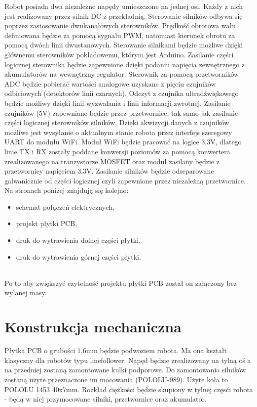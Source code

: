 \documentclass[10pt, a4paper]{article}
\begin{document}
Robot posiada dwa niezależne napędy umieszczone na jednej osi. Każdy z nich jest realizowany przez silnik DC z przekładnią. Sterowanie silników odbywa się poprzez zastosowanie dwukanałowych sterowników. Prędkość obrotowa wału definiowana będzie za pomocą sygnału PWM, natomiast kierunek obrotu za pomocą dwóch linii dwustanowych. Sterowanie silnikami będzie możliwe dzięki głównemu sterowników pokładowemu, którym jest Arduino. Zasilanie części logicznej sterownika będzie zapewnione dzięki podaniu napięcia zewnętrznego z akumulatorów na wewnętrzny regulator. Sterownik za pomocą przetworników ADC będzie pobierać wartości analogowe uzyskane z pięciu czujników odbiciowych (detektorów linii czarnych). Odczyt z czujnika ultradźwiękowego będzie możliwy dzięki linii wyzwalania i linii informacji zwrotnej. Zasilanie czujników (5V) zapewniane będzie przez przetwornice, tak samo jak zasilanie części logicznej sterowników silników. Dzięki akwizycji danych z czujników możliwe jest wysyłanie o aktualnym stanie robota przez interfejs szeregowy UART do modułu WiFi. Moduł WiFi będzie pracować na logice 3,3V, dlatego linie TX i RX zostały poddane konwersji poziomów za pomocą konwertera zrealizowanego na tranzystorze MOSFET oraz moduł zasilany będzie z przetwornicy napięciem 3,3V.  Zasilanie silników będzie odseparowane galwanicznie od części logicznej czyli zapewnione przez niezależną przetwornice.
\\
Na stronach poniżej znajdują się kolejno:
\begin{itemize}
    \item schemat połączeń elektrycznych,
    \item projekt płytki PCB,
    \item druk do wytrawienia dolnej części płytki,
    \item druk do wytrawienia górnej części płytki.
\end{itemize}
\\
Po to aby zwiększyć czytelność projektu płytki PCB został on załączony bez wylanej masy.






\section{Konstrukcja mechaniczna}

Płytka PCB o grubości 1,6mm będzie podwoziem robota. Ma ona kształt klasyczny dla robotów typu linefollower. Napęd będzie zrealizowany na tylną oś a na przedniej zostaną zamontowane kulki podporowe. Do zamontowania silników zostaną użyte przeznaczone im mocowania (POLOLU-989). Użyte koła to POLOLU 1453 40x7mm. Rozkład ciężkości będzie skupiony w tylnej częsći robota - będą w niej przymocowane silniki, przetwornice oraz akumulator.
\end{document}
